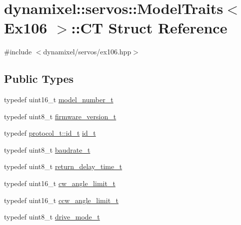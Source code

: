 \hypertarget{structdynamixel_1_1servos_1_1_model_traits_3_01_ex106_01_4_1_1_c_t}{}\section{dynamixel\+:\+:servos\+:\+:Model\+Traits$<$ Ex106 $>$\+:\+:CT Struct Reference}
\label{structdynamixel_1_1servos_1_1_model_traits_3_01_ex106_01_4_1_1_c_t}


{\ttfamily \#include $<$dynamixel/servos/ex106.\+hpp$>$}

\subsection*{Public Types}
\begin{DoxyCompactItemize}
\item 
typedef uint16\+\_\+t \hyperlink{structdynamixel_1_1servos_1_1_model_traits_3_01_ex106_01_4_1_1_c_t_a07c5df06e773fd5771625d505c3de0ca}{model\+\_\+number\+\_\+t}
\item 
typedef uint8\+\_\+t \hyperlink{structdynamixel_1_1servos_1_1_model_traits_3_01_ex106_01_4_1_1_c_t_ac8f660f966bf29c3c736aa9e9d1443f8}{firmware\+\_\+version\+\_\+t}
\item 
typedef \hyperlink{classdynamixel_1_1protocols_1_1_protocol1_a1d4dfa22b01f80b1876d14f539d52b5c}{protocol\+\_\+t\+::id\+\_\+t} \hyperlink{structdynamixel_1_1servos_1_1_model_traits_3_01_ex106_01_4_1_1_c_t_a285b3a76ceab67451ee5bcbe074d3272}{id\+\_\+t}
\item 
typedef uint8\+\_\+t \hyperlink{structdynamixel_1_1servos_1_1_model_traits_3_01_ex106_01_4_1_1_c_t_a8c4151bb3b423c0762b71628baa77abd}{baudrate\+\_\+t}
\item 
typedef uint8\+\_\+t \hyperlink{structdynamixel_1_1servos_1_1_model_traits_3_01_ex106_01_4_1_1_c_t_a81f1c424b45176e7a63edf9aa7dd2101}{return\+\_\+delay\+\_\+time\+\_\+t}
\item 
typedef uint16\+\_\+t \hyperlink{structdynamixel_1_1servos_1_1_model_traits_3_01_ex106_01_4_1_1_c_t_afca1ab1b074dd77da2fd15a6c9c1c7a1}{cw\+\_\+angle\+\_\+limit\+\_\+t}
\item 
typedef uint16\+\_\+t \hyperlink{structdynamixel_1_1servos_1_1_model_traits_3_01_ex106_01_4_1_1_c_t_a1f579ef8e070c4addc7a1192c3377cab}{ccw\+\_\+angle\+\_\+limit\+\_\+t}
\item 
typedef uint8\+\_\+t \hyperlink{structdynamixel_1_1servos_1_1_model_traits_3_01_ex106_01_4_1_1_c_t_a8a1a8bfea005f9c16869c5bc1210a6ba}{drive\+\_\+mode\+\_\+t}

\end{DoxyCompactItemize}
